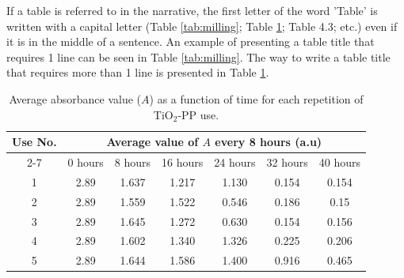 If a table is referred to in the narrative, the first letter of the word 'Table' is written with a capital letter (Table \ref{tab:milling}; Table \ref{tab:absorbansi}; Table 4.3; etc.) even if it is in the middle of a sentence. An example of presenting a table title that requires 1 line can be seen in Table \ref{tab:milling}. The way to write a table title that requires more than 1 line is presented in Table \ref{tab:absorbansi}.

\begin{table}[htbp]
    \centering
    \caption{Average absorbance value ($A$) as a function of time for each repetition of TiO$_2$-PP use.}
    \begin{tabular}{ccccccc}
        \toprule
        Use No. & \multicolumn{6}{c}{Average value of $A$ every 8 hours (a.u)} \\
        \cmidrule(lr){2-7}
        & 0 hours & 8 hours & 16 hours & 24 hours & 32 hours & 40 hours \\
        \midrule
        1 & 2.89 & 1.637 & 1.217 & 1.130 & 0.154 & 0.154 \\
        2 & 2.89 & 1.559 & 1.522 & 0.546 & 0.186 & 0.15 \\
        3 & 2.89 & 1.645 & 1.272 & 0.630 & 0.154 & 0.156 \\
        4 & 2.89 & 1.602 & 1.340 & 1.326 & 0.225 & 0.206 \\
        5 & 2.89 & 1.644 & 1.586 & 1.400 & 0.916 & 0.465 \\
        \bottomrule
    \end{tabular}
    \label{tab:absorbansi}
\end{table}
